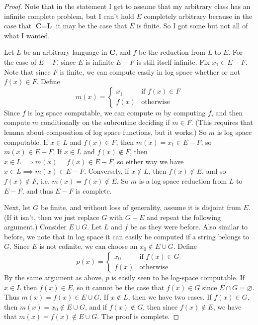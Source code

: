 \begin{proof}
	Note that in the statement I get to assume that my arbitrary class has an infinite complete problem, but I can't hold $E$ completely arbitrary because in the case that $\textbf{C} = \textbf{L}$ it may be the case that $E$ is finite. So I got some but not all of what I wanted.
	\par Let $L$ be an arbitrary language in \textbf{C}, and $f$ be the reduction from $L$ to $E$. For the case of $E-F$, since $E$ is infinite $E-F$ is still itself infinite. Fix $x_1 \in E-F$. Note that since $F$ is finite, we can compute easily in log space whether or not $f(x) \in F$. Define
	\[ m(x) = \begin{cases}
				x_1 & \textrm{if $f(x) \in F$} \\
				f(x) & \textrm{otherwise}
				\end{cases} \]
Since $f$ is log space computable, we can compute $m$ by computing $f$, and then compute $m$ conditionally on the subroutine deciding if $m \in F$. (This requires that lemma about composition of log space functions, but it works.) So $m$ is log space computable. If $x \in L$ and $f(x) \in F$, then $m(x) = x_1 \in E-F$, so $m(x) \in E-F$. If $x \in L$ and $f(x) \notin F$, then $x \in L \implies m(x) = f(x) \in E-F$, so either way we have $x \in L \implies m(x) \in E-F$. Conversely, if $x \notin L$, then $f(x) \notin E$, and so $f(x) \notin F$, i.e. $m(x) = f(x) \notin E$. So $m$ is a log space reduction from $L$ to $E-F$, and thus $E-F$ is complete.
\par Next, let $G$ be finite, and without loss of generality, assume it is disjoint from $E$. (If it isn't, then we just replace $G$ with $G-E$ and repeat the following argument.) Consider $E \cup G$. Let $L$ and $f$ be as they were before. Also similar to before, we note that in log space it can easily be computed if a string belongs to $G$. Since $E$ is not cofinite, we can choose an $x_0 \notin E \cup G$. Define 
\[ p(x) = \begin{cases}
			x_0 & \textrm{if $f(x) \in G$} \\
			f(x) & \textrm{otherwise}
\end{cases} \]   
By the same argument as above, $p$ is easily seen to be log-space computable. If $x \in L$ then $f(x) \in E$, so it cannot be the case that $f(x) \in G$ since $E \cap G = \varnothing$. Thus $m(x) = f(x) \in E \cup G$. If $x \notin L$, then we have two cases. If $f(x) \in G$, then $m(x) = x_0 \notin E \cup G$, and if $f(x) \notin G$, then since $f(x) \notin E$, we have that $m(x) = f(x) \notin E \cup G$. The proof is complete.
\end{proof}
